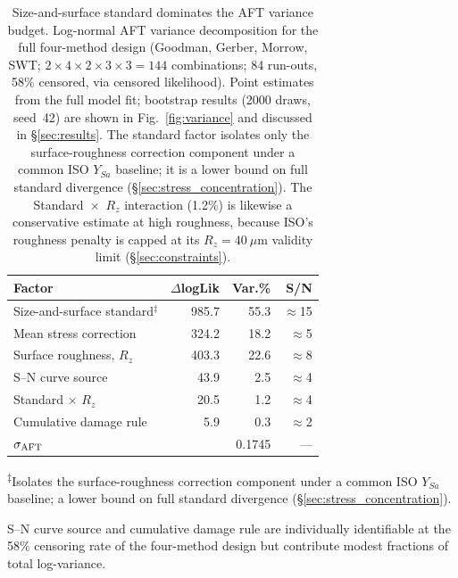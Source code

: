 \documentclass[twocolumn,12pt,a4paper]{article}
\begin{document}
\begin{table}[h]
\centering
\caption{Size-and-surface standard dominates the AFT variance budget.
Log-normal AFT variance decomposition for the full four-method design
(Goodman, Gerber, Morrow, SWT;
$2\times4\times2\times3\times3 = 144$ combinations; 84 run-outs,
58\% censored, via censored likelihood). Point estimates from the
full model fit; bootstrap results (2000 draws, seed~42) are shown
in Fig.~\ref{fig:variance} and discussed in \S\ref{sec:results}.
The standard factor isolates only the surface-roughness correction
component under a common ISO $Y_{Sa}$ baseline; it is a lower bound
on full standard divergence (\S\ref{sec:stress_concentration}). The
Standard~$\times$~$R_z$ interaction (1.2\%) is likewise a conservative
estimate at high roughness, because ISO's roughness penalty is capped
at its $R_z=40~\mu$m validity limit
(\S\ref{sec:constraints}).}
\label{tab:anova}
\footnotesize
\begin{tabular}{lrrr}
\toprule
Factor & $\Delta$logLik & Var.\% & S/N \\
\midrule
Size-and-surface standard$^\ddagger$ & 985.7 & 55.3 & $\approx$15 \\ %
Mean stress correction & 324.2 & 18.2 & $\approx$5 \\ %
Surface roughness, $R_z$    & 403.3 & 22.6 & $\approx$8 \\ %
S--N curve source      & 43.9 &  2.5 &  $\approx$4 \\ %
Standard $\times$ $R_z$     & 20.5 &  1.2 &  $\approx$4 \\ %
Cumulative damage rule &  5.9 &  0.3 &  $\approx$2 \\ %
\midrule
$\sigma_{\rm AFT}$          &        & 0.1745 & --- \\
\bottomrule
\end{tabular}

\medskip\noindent\textsuperscript{$\ddagger$}Isolates the surface-roughness
correction component under a common ISO $Y_{Sa}$ baseline; a lower bound on
full standard divergence (\S\ref{sec:stress_concentration}).

\noindent S--N curve source and cumulative damage rule are individually
identifiable at the 58\% censoring rate of the four-method design but
contribute modest fractions of total log-variance.
\end{table}
\end{document}
